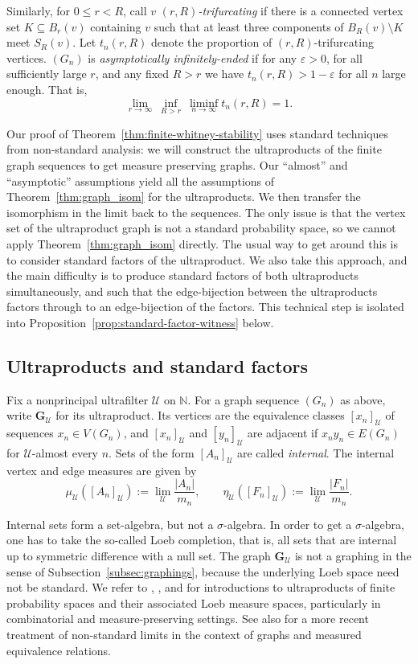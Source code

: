 \documentclass{article}
\theoremstyle{plain}
\theoremstyle{definition}
\newcommand{\N}{\mathbb{N}}
\newcommand{\cU}{\mathcal{U}}
\begin{document}
Similarly, for $0\leq r<R$, call $v$ \emph{$(r,R)$-trifurcating} if there is a connected vertex set $K\subseteq B_r(v)$ containing $v$ such that at least three components of $B_R(v)\setminus K$ meet $S_R(v)$. Let $t_n(r,R)$ denote the proportion of $(r,R)$-trifurcating vertices. $(G_n)$ is \emph{asymptotically infinitely-ended} if for any $\varepsilon > 0$, for all sufficiently large $r$, and any fixed $R>r$ we have $t_n(r,R) > 1- \varepsilon$ for all $n$ large enough. That is, \[\lim_{r\to\infty}\ \inf_{R>r}\ \liminf_{n\to\infty}t_n(r,R)=1.\]

Our proof of Theorem~\ref{thm:finite-whitney-stability} uses standard techniques from non-standard analysis: we will construct the ultraproducts of the finite graph sequences to get measure preserving graphs. Our ``almost'' and ``asymptotic'' assumptions yield all the assumptions of Theorem~\ref{thm:graph_isom} for the ultraproducts. We then transfer the isomorphism in the limit back to the sequences. The only issue is that the vertex set of the ultraproduct graph is not a standard probability space, so we cannot apply Theorem~\ref{thm:graph_isom} directly. The usual way to get around this is to consider standard factors of the ultraproduct. We also take this approach, and the main difficulty is to produce standard factors of both ultraproducts simultaneously, and such that the edge-bijection between the ultraproducts factors through to an edge-bijection of the factors. This technical step is isolated into Proposition~\ref{prop:standard-factor-witness} below.


\subsection{Ultraproducts and standard factors}\label{subsec:ultraproducts}

Fix a nonprincipal ultrafilter $\cU$ on $\N$. For a graph sequence $(G_n)$ as above, write $\mathbf G_{\cU}$ for its ultraproduct. Its vertices are the equivalence classes $[x_n]_{\cU}$ of sequences $x_n\in V(G_n)$, and $[x_n]_{\cU}$ and $[y_n]_{\cU}$ are adjacent if $x_ny_n\in E(G_n)$ for $\cU$-almost every $n$. Sets of the form $[A_n]_{\cU}$ are called \emph{internal}. The internal vertex and edge measures are given by
\[
    \mu_{\cU}([A_n]_{\cU}):=\lim_{\cU}\frac{|A_n|}{m_n}, \qquad\eta_{\cU}([F_n]_{\cU}):=\lim_{\cU}\frac{|F_n|}{m_n}.
\]

Internal sets form a set-algebra, but not a $\sigma$-algebra. In order to get a $\sigma$-algebra, one has to take the so-called Loeb completion, that is, all sets that are internal up to symmetric difference with a null set. The graph  $\mathbf G_{\cU}$ is not a graphing in the sense of Subsection~\ref{subsec:graphings}, because the underlying Loeb space need not be standard. We refer to \cite[Section 2.7]{elek2012measure-theoretic}, \cite{conley2013ultraproducts}, and \cite{carderi2015ultraproducts} for introductions to ultraproducts of finite probability spaces and their associated Loeb measure spaces, particularly in combinatorial and measure-preserving settings. See also \cite{carderi2021non-standard} for a more recent treatment of non-standard limits in the context of graphs and measured equivalence relations. 
\end{document}
